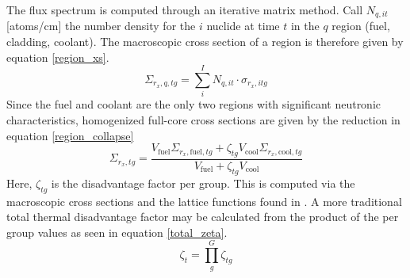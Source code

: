 The flux spectrum is computed through an iterative matrix method.  Call $N_{q,it}$ [atoms/cm] 
the number density for the $i$ nuclide at time $t$ in the $q$ region 
(fuel, cladding, coolant).  The macroscopic cross section of a region is therefore given by equation 
\ref{region_xs}.
\begin{equation}
\label{region_xs}
\Sigma_{r_x,q,tg} = \sum_i^I N_{q,it} \cdot \sigma_{r_x,itg}
\end{equation}
Since the fuel and coolant are the only two regions with significant neutronic characteristics, 
homogenized full-core cross sections are given by the reduction in equation \ref{region_collapse}
\begin{equation}
\label{region_collapse}
\Sigma_{r_x,tg} = \frac{V_{\mbox{fuel}}\Sigma_{r_x,\mbox{fuel},tg} + \zeta_{tg}V_{\mbox{cool}}\Sigma_{r_x,\mbox{cool},tg}}
                       {V_{\mbox{fuel}} + \zeta_{tg}V_{\mbox{cool}}}
\end{equation}
Here, $\zeta_{tg}$ is the disadvantage factor per group.  This is computed via the macroscopic 
cross sections and the lattice functions found in \cite{Lamarsh2002}.  A more traditional
total thermal disadvantage factor may be calculated from the product of the per group values 
as seen in equation \ref{total_zeta}.
\begin{equation}
\label{total_zeta}
\zeta_t = \prod_g^G \zeta_{tg}
\end{equation}


